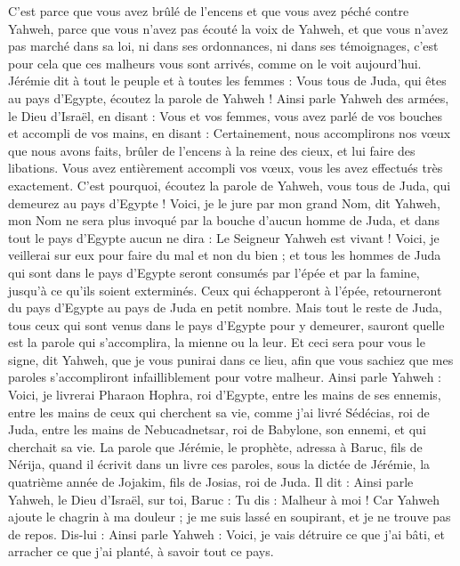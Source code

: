 \begin{multicols}{2}
C'est parce que vous avez brûlé de l'encens et que vous avez péché contre Yahweh, parce que vous n'avez pas écouté la voix de Yahweh, et que vous n'avez pas marché dans sa loi, ni dans ses ordonnances, ni dans ses témoignages, c'est pour cela que ces malheurs vous sont arrivés, comme on le voit aujourd'hui.
Jérémie dit à tout le peuple et à toutes les femmes : Vous tous de Juda, qui êtes au pays d'Egypte, écoutez la parole de Yahweh !
Ainsi parle Yahweh des armées, le Dieu d'Israël, en disant : Vous et vos femmes, vous avez parlé de vos bouches et accompli de vos mains, en disant : Certainement, nous accomplirons nos vœux que nous avons faits, brûler de l'encens à la reine des cieux, et lui faire des libations. Vous avez entièrement accompli vos vœux, vous les avez effectués très exactement.
C'est pourquoi, écoutez la parole de Yahweh, vous tous de Juda, qui demeurez au pays d'Egypte ! Voici, je le jure par mon grand Nom, dit Yahweh, mon Nom ne sera plus invoqué par la bouche d'aucun homme de Juda, et dans tout le pays d'Egypte aucun ne dira : Le Seigneur Yahweh est vivant !
Voici, je veillerai sur eux pour faire du mal et non du bien ; et tous les hommes de Juda qui sont dans le pays d'Egypte seront consumés par l'épée et par la famine, jusqu'à ce qu'ils soient exterminés.
Ceux qui échapperont à l'épée, retourneront du pays d'Egypte au pays de Juda en petit nombre. Mais tout le reste de Juda, tous ceux qui sont venus dans le pays d'Egypte pour y demeurer, sauront quelle est la parole qui s'accomplira, la mienne ou la leur.
Et ceci sera pour vous le signe, dit Yahweh, que je vous punirai dans ce lieu, afin que vous sachiez que mes paroles s'accompliront infailliblement pour votre malheur.
Ainsi parle Yahweh : Voici, je livrerai Pharaon Hophra, roi d'Egypte, entre les mains de ses ennemis, entre les mains de ceux qui cherchent sa vie, comme j'ai livré Sédécias, roi de Juda, entre les mains de Nebucadnetsar, roi de Babylone, son ennemi, et qui cherchait sa vie.
\VerseOne{}La parole que Jérémie, le prophète, adressa à Baruc, fils de Nérija, quand il écrivit dans un livre ces paroles, sous la dictée de Jérémie, la quatrième année de Jojakim, fils de Josias, roi de Juda. Il dit :
Ainsi parle Yahweh, le Dieu d'Israël, sur toi, Baruc :
Tu dis : Malheur à moi ! Car Yahweh ajoute le chagrin à ma douleur ; je me suis lassé en soupirant, et je ne trouve pas de repos.
Dis-lui : Ainsi parle Yahweh : Voici, je vais détruire ce que j'ai bâti, et arracher ce que j'ai planté, à savoir tout ce pays.

\end{multicols}
